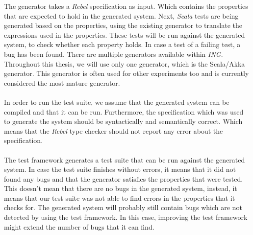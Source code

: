 The generator takes a \textit{Rebel} specification as input. Which contains the
properties that are expected to hold in the generated system. Next,
\textit{Scala} tests are being generated based on the properties, using the
existing generator to translate the expressions used in the properties. These
tests will be run against the generated system, to check whether each property
holds. In case a test of a failing test, a bug has been found. There are
multiple generators available within \textit{ING}. Throughout this thesis, we
will use only one generator, which is the Scala/Akka generator. This generator
is often used for other experiments too and is currently considered the most
mature generator.\\
\\
In order to run the test suite, we assume that the generated system can be
compiled and that it can be run. Furthermore, the specification which was used
to generate the system should be syntactically and semantically correct. Which
means that the \textit{Rebel} type checker should not report any error about the
specification.\\
\\
The test framework generates a test suite that can be run against the generated
system. In case the test suite finishes without errors, it means that it did not
found any bugs and that the generator satisfies the properties that were tested.
This doesn't mean that there are no bugs in the generated system, instead, it
means that our test suite was not able to find errors in the properties that it
checks for. The generated system will probably still contain bugs which are not
detected by using the test framework. In this case, improving the test framework
might extend the number of bugs that it can find.

